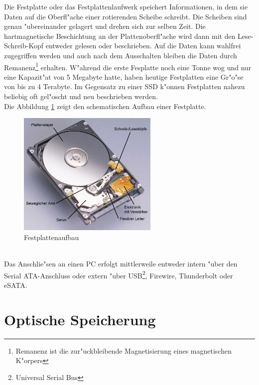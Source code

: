             Die Festplatte oder das Festplattenlaufwerk speichert Informationen, in dem sie Daten auf die Oberfl"ache einer rotierenden Scheibe schreibt. Die Scheiben sind genau "ubereinander gelagert und drehen sich zur selben Zeit. Die hartmagnetische Beschichtung an der Plattenoberfl"ache wird dann mit den Lese-Schreib-Kopf entweder gelesen oder beschrieben. Auf die Daten kann wahlfrei zugegriffen werden und auch nach dem Ausschalten bleiben die Daten durch Remanenz\footnote{Remanenz ist die zur"uckbleibende Magnetisierung eines magnetischen K"orpers} erhalten. W"ahrend die erste Fesplatte noch eine Tonne wog und nur eine Kapazit"at von 5 Megabyte hatte, haben heutige Festplatten eine Gr"o"se von bis zu 4 Terabyte. Im Gegensatz zu einer SSD k"onnen Festplatten nahezu beliebig oft gel"oscht und neu beschrieben werden.
			\\
			Die Abbildung \ref{fig:hdd} zeigt den schematischen Aufbau einer Festplatte.
			\begin{figure}[ht]
				\centering
				\includegraphics[width=0.6\textwidth]{images/hdd} 
				\caption[Festplattenaufbau \cite{fig:hdd}]{Festplattenaufbau}
				\label{fig:hdd}
				\end{figure}
            \\
            Das Anschlie"sen an einen PC erfolgt mittlerweile entweder intern "uber den Serial ATA-Anschluss oder extern "uber USB\footnote{Universal Serial Bus}, Firewire, Thunderbolt oder eSATA. 
    
    
    \section{Optische Speicherung}
    \label{ch:Technisch:sec:Optische Speicherung}
    
